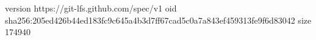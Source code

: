 version https://git-lfs.github.com/spec/v1
oid sha256:205ed426b44ed183fc9c645a4b3d7ff67cad5c0a7a843ef459313fe9f6d83042
size 174940
